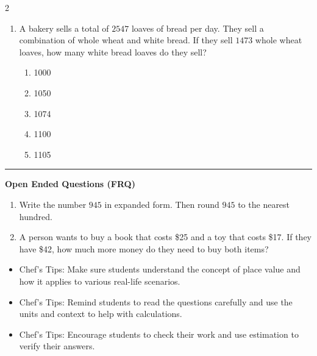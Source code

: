 \documentclass[10pt]{article}
\begin{document}
\begin{multicols}{2}
\begin{enumerate}[label=\textbf{Q\arabic*.}, leftmargin=*, itemsep=6pt, parsep=0pt]
  \item \small A bakery sells a total of $2547$ loaves of bread per day. They sell a combination of whole wheat and white bread. If they sell $1473$ whole wheat loaves, how many white bread loaves do they sell?
  \begin{enumerate}[label=(\Alph*), leftmargin=0.6cm, nosep, itemsep=2pt]
    \item 1000
    \item 1050
    \item 1074
    \item 1100
    \item 1105
  \end{enumerate}

\end{enumerate}
\end{multicols}

\vspace{-0.2cm}
\hrule
\vspace{0.2cm}
\textbf{\small Open Ended Questions (FRQ)}
\begin{enumerate}[label=\textbf{Q\arabic*.}, start=9, itemsep=5pt, topsep=0pt]

  \item \small Write the number $945$ in expanded form. Then round $945$ to the nearest hundred. \vspace{2cm}

  \item \small A person wants to buy a book that costs \$25 and a toy that costs \$17. If they have \$42, how much more money do they need to buy both items? \vspace{2cm}

\end{enumerate}

\vfill

\begin{tcolorbox}[colback=blue!5, colframe=mainblue!50, title=\small \textbf{Chef's Tips}, fonttitle=\bfseries, bottom=1mm]
\begin{itemize}[noitemsep, topsep=2pt, leftmargin=0.5cm]
  \item \scriptsize Chef's Tips: Make sure students understand the concept of place value and how it applies to various real-life scenarios.\item \scriptsize Chef's Tips: Remind students to read the questions carefully and use the units and context to help with calculations.\item \scriptsize Chef's Tips: Encourage students to check their work and use estimation to verify their answers.
\end{itemize}
\end{tcolorbox}
\end{document}

